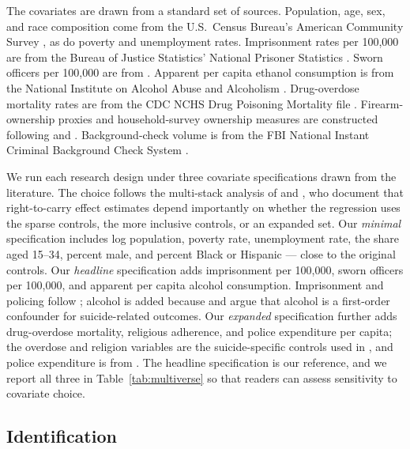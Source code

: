 \documentclass[12pt]{article}
\begin{document}

The covariates are drawn from a standard set of sources. Population,
age, sex, and race composition come from the U.S.\ Census Bureau's
American Community Survey \citep{acsdata}, as do poverty and
unemployment rates. Imprisonment rates per 100,000 are from the
Bureau of Justice Statistics' National Prisoner Statistics
\citep{bjsnps}. Sworn officers per 100,000 are from
\citet{kaplanleoka}. Apparent per capita ethanol consumption is
from the National Institute on Alcohol Abuse and Alcoholism
\citep{niaaadata}. Drug-overdose mortality rates are from the CDC
NCHS Drug Poisoning Mortality file \citep{cdcdrugoverdose}.
Firearm-ownership proxies and household-survey ownership measures
are constructed following \citet{cookludwig2006} and
\citet{rand2024}. Background-check volume is from the FBI National
Instant Criminal Background Check System \citep{nicsdata}.

We run each research design under three covariate specifications
drawn from the literature. The choice follows the multi-stack
analysis of \citet{anejadonohuezhang2014} and \citet{donohue2019},
who document that right-to-carry effect estimates depend
importantly on whether the regression uses the sparse
\citet{lott1997} controls, the more inclusive \citet{donohue2019}
controls, or an expanded set. Our \emph{minimal} specification
includes log population, poverty rate, unemployment rate, the share
aged 15--34, percent male, and percent Black or Hispanic --- close
to the original \citet{lott1997} controls. Our \emph{headline}
specification adds imprisonment per 100,000, sworn officers per
100,000, and apparent per capita alcohol consumption. Imprisonment
and policing follow \citet{donohue2019}; alcohol is added because
\citet{mcclellan2017} and \citet{markowitz2003} argue that alcohol
is a first-order confounder for suicide-related outcomes. Our
\emph{expanded} specification further adds drug-overdose mortality,
religious adherence, and police expenditure per capita; the
overdose and religion variables are the suicide-specific controls
used in \citet{crifasi2015}, and police expenditure is from
\citet{donohue2019}. The headline specification is our reference,
and we report all three in Table~\ref{tab:multiverse} so that
readers can assess sensitivity to covariate choice.

\subsection{Identification}\label{sec:id}
\end{document}
